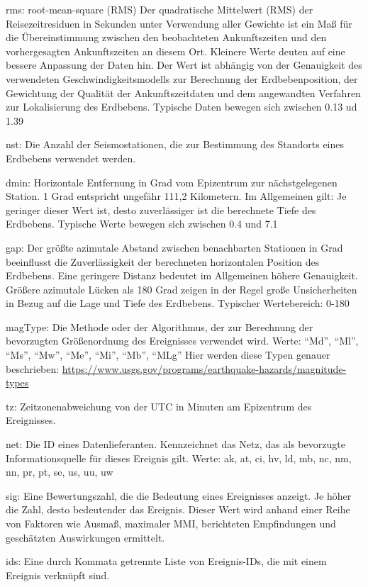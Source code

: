 \documentclass[
]{article}
\begin{document}
rms: root-mean-square (RMS) Der quadratische Mittelwert (RMS) der
Reisezeitresiduen in Sekunden unter Verwendung aller Gewichte ist ein
Maß für die Übereinstimmung zwischen den beobachteten Ankunftszeiten und
den vorhergesagten Ankunftszeiten an diesem Ort. Kleinere Werte deuten
auf eine bessere Anpassung der Daten hin. Der Wert ist abhängig von der
Genauigkeit des verwendeten Geschwindigkeitsmodells zur Berechnung der
Erdbebenposition, der Gewichtung der Qualität der Ankunftszeitdaten und
dem angewandten Verfahren zur Lokalisierung des Erdbebens. Typische
Daten bewegen sich zwischen 0.13 ud 1.39

nst: Die Anzahl der Seismostationen, die zur Bestimmung des Standorts
eines Erdbebens verwendet werden.

dmin: Horizontale Entfernung in Grad vom Epizentrum zur nächstgelegenen
Station. 1 Grad entspricht ungefähr 111,2 Kilometern. Im Allgemeinen
gilt: Je geringer dieser Wert ist, desto zuverlässiger ist die
berechnete Tiefe des Erdbebens. Typische Werte bewegen sich zwischen 0.4
und 7.1

gap: Der größte azimutale Abstand zwischen benachbarten Stationen in
Grad beeinflusst die Zuverlässigkeit der berechneten horizontalen
Position des Erdbebens. Eine geringere Distanz bedeutet im Allgemeinen
höhere Genauigkeit. Größere azimutale Lücken als 180 Grad zeigen in der
Regel große Unsicherheiten in Bezug auf die Lage und Tiefe des
Erdbebens. Typischer Wertebereich: 0-180

magType: Die Methode oder der Algorithmus, der zur Berechnung der
bevorzugten Größenordnung des Ereignisses verwendet wird. Werte: ``Md'',
``Ml'', ``Ms'', ``Mw'', ``Me'', ``Mi'', ``Mb'', ``MLg'' Hier werden
diese Typen genauer beschrieben:
\url{https://www.usgs.gov/programs/earthquake-hazards/magnitude-types}

tz: Zeitzonenabweichung von der UTC in Minuten am Epizentrum des
Ereignisses.

net: Die ID eines Datenlieferanten. Kennzeichnet das Netz, das als
bevorzugte Informationsquelle für dieses Ereignis gilt. Werte: ak, at,
ci, hv, ld, mb, nc, nm, nn, pr, pt, se, us, uu, uw

sig: Eine Bewertungszahl, die die Bedeutung eines Ereignisses anzeigt.
Je höher die Zahl, desto bedeutender das Ereignis. Dieser Wert wird
anhand einer Reihe von Faktoren wie Ausmaß, maximaler MMI, berichteten
Empfindungen und geschätzten Auswirkungen ermittelt.

ids: Eine durch Kommata getrennte Liste von Ereignis-IDs, die mit einem
Ereignis verknüpft sind.
\end{document}
